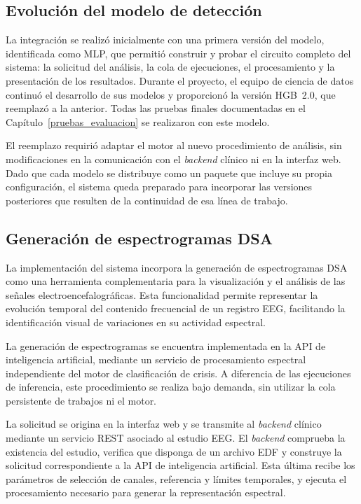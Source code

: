 \subsection{Evolución del modelo de detección}
\label{subsec:evolucion-modelo}

La integración se realizó inicialmente con una primera versión del modelo, identificada como MLP, que permitió construir y probar el circuito completo del sistema: la solicitud del análisis, la cola de ejecuciones, el procesamiento y la presentación de los resultados.
Durante el proyecto, el equipo de ciencia de datos continuó el desarrollo de sus modelos y proporcionó la versión HGB~2.0, que reemplazó a la anterior.
Todas las pruebas finales documentadas en el Capítulo~\ref{pruebas_evaluacion} se realizaron con este modelo.

El reemplazo requirió adaptar el motor al nuevo procedimiento de análisis, sin modificaciones en la comunicación con el \textit{backend} clínico ni en la interfaz web.
Dado que cada modelo se distribuye como un paquete que incluye su propia configuración, el sistema queda preparado para incorporar las versiones posteriores que resulten de la continuidad de esa línea de trabajo.

\subsection{Generación de espectrogramas DSA}

La implementación del sistema incorpora la generación de
espectrogramas DSA como
una herramienta complementaria para la visualización y el
análisis de las señales electroencefalográficas. Esta
funcionalidad permite representar la evolución temporal
del contenido frecuencial de un registro EEG, facilitando
la identificación visual de variaciones en su actividad
espectral.

La generación de espectrogramas se encuentra implementada
en la API de inteligencia artificial, mediante un servicio
de procesamiento espectral independiente del motor de
clasificación de crisis. A diferencia de las ejecuciones
de inferencia, este procedimiento se realiza bajo demanda,
sin utilizar la cola persistente de trabajos ni el motor.

La solicitud se origina en la interfaz web y se transmite
al \textit{backend} clínico mediante un servicio REST asociado al
estudio EEG. El \textit{backend} comprueba la existencia del estudio,
verifica que disponga de un archivo EDF y construye la
solicitud correspondiente a la API de inteligencia
artificial. Esta última recibe los parámetros de selección
de canales, referencia y límites temporales, y ejecuta
el procesamiento necesario para generar la representación
espectral.

